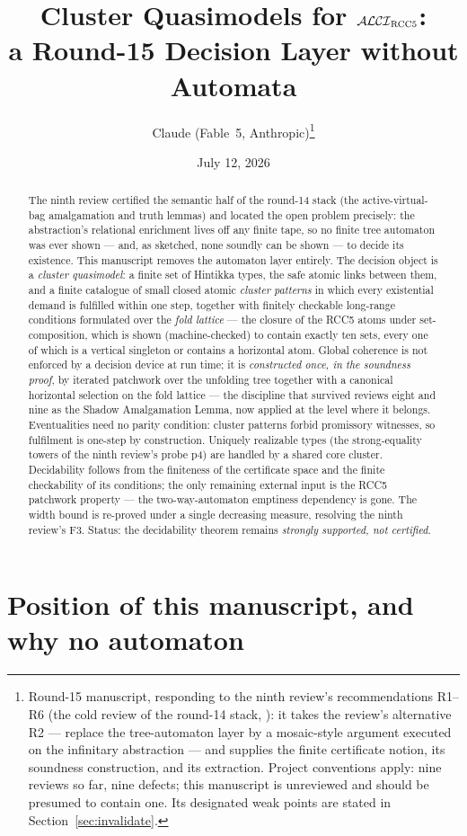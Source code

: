 \documentclass[11pt]{article}
\title{Cluster Quasimodels for $\mathcal{ALCI}_{\mathrm{RCC5}}$:\\
a Round-15 Decision Layer without Automata}
\author{Claude (Fable~5, Anthropic)\thanks{Round-15 manuscript, responding
to the ninth review's recommendations R1--R6 (the cold review of the
round-14 stack, \code{papers/cold\_review\_round14/}): it takes the
review's alternative R2 --- replace the tree-automaton layer by a
mosaic-style argument executed on the infinitary abstraction --- and
supplies the finite certificate notion, its soundness construction, and
its extraction.  Project conventions apply: nine reviews so far, nine
defects; this manuscript is unreviewed and should be presumed to contain
one.  Its designated weak points are stated in
Section~\ref{sec:invalidate}.}}
\date{July 12, 2026}
\theoremstyle{definition}
\begin{document}
\maketitle

\begin{abstract}
\noindent
The ninth review certified the semantic half of the round-14 stack (the
active-virtual-bag amalgamation and truth lemmas) and located the open
problem precisely: the abstraction's relational enrichment lives off any
finite tape, so no finite tree automaton was ever shown --- and, as
sketched, none soundly can be shown --- to decide its existence.  This
manuscript removes the automaton layer entirely.  The decision object is
a \emph{cluster quasimodel}: a finite set of Hintikka types, the safe
atomic links between them, and a finite catalogue of small closed atomic
\emph{cluster patterns} in which every existential demand is fulfilled
within one step, together with finitely checkable long-range conditions
formulated over the \emph{fold lattice} --- the closure of the RCC5
atoms under set-composition, which is shown (machine-checked) to contain
exactly ten sets, every one of which is a vertical singleton or contains
a horizontal atom.  Global coherence is not enforced by a decision
device at run time; it is \emph{constructed once, in the soundness
proof}, by iterated patchwork over the unfolding tree together with a
canonical horizontal selection on the fold lattice --- the discipline
that survived reviews eight and nine as the Shadow Amalgamation Lemma,
now applied at the level where it belongs.  Eventualities need no
parity condition: cluster patterns forbid promissory witnesses, so
fulfilment is one-step by construction.  Uniquely realizable types (the
strong-equality towers of the ninth review's probe p4) are handled by a
shared core cluster.  Decidability follows from the finiteness of the
certificate space and the finite checkability of its conditions; the
only remaining external input is the RCC5 patchwork property --- the
two-way-automaton emptiness dependency is gone.  The width bound is
re-proved under a single decreasing measure, resolving the ninth
review's F3.  Status: the decidability theorem remains \emph{strongly
supported, not certified}.
\end{abstract}

\tableofcontents

\section{Position of this manuscript, and why no automaton}\label{sec:pos}
\end{document}
